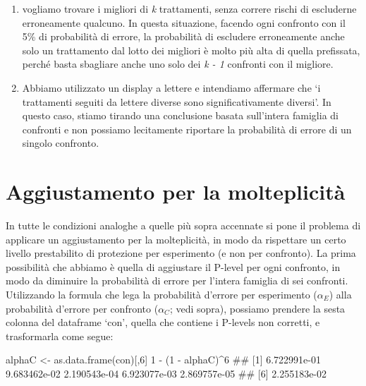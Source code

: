\documentclass[a4paper,12pt,oneside]{book}
\providecommand{\tightlist}{%
  \setlength{\itemsep}{0pt}\setlength{\parskip}{0pt}}
\newenvironment{Shaded}{\begin{snugshade}}{\end{snugshade}}
\newcommand{\DecValTok}[1]{#1}
\newcommand{\SpecialCharTok}[1]{#1}
\newcommand{\DocumentationTok}[1]{#1}
\newcommand{\OtherTok}[1]{#1}
\newcommand{\FunctionTok}[1]{#1}
\newcommand{\NormalTok}[1]{#1}
\begin{document}
\begin{enumerate}
\def\labelenumi{\arabic{enumi}.}
\tightlist
\item
  vogliamo trovare i migliori di \emph{k} trattamenti, senza correre rischi di escluderne erroneamente qualcuno. In questa situazione, facendo ogni confronto con il 5\% di probabilità di errore, la probabilità di escludere erroneamente anche solo un trattamento dal lotto dei migliori è molto più alta di quella prefissata, perché basta sbagliare anche uno solo dei \emph{k - 1} confronti con il migliore.
\item
  Abbiamo utilizzato un display a lettere e intendiamo affermare che `i trattamenti seguiti da lettere diverse sono significativamente diversi'. In questo caso, stiamo tirando una conclusione basata sull'intera famiglia di confronti e non possiamo lecitamente riportare la probabilità di errore di un singolo confronto.
\end{enumerate}

\hypertarget{aggiustamento-per-la-molteplicituxe0}{%
\section{Aggiustamento per la molteplicità}\label{aggiustamento-per-la-molteplicituxe0}}

In tutte le condizioni analoghe a quelle più sopra accennate si pone il problema di applicare un aggiustamento per la molteplicità, in modo da rispettare un certo livello prestabilito di protezione per esperimento (e non per confronto). La prima possibilità che abbiamo è quella di aggiustare il P-level per ogni confronto, in modo da diminuire la probabilità di errore per l'intera famiglia di sei confronti. Utilizzando la formula che lega la probabilità d'errore per esperimento (\(\alpha_E\)) alla probabilità d'errore per confronto (\(\alpha_C\); vedi sopra), possiamo prendere la sesta colonna del dataframe `con', quella che contiene i P-levels non corretti, e trasformarla come segue:

\scriptsize

\begin{Shaded}
\begin{Highlighting}[]
\NormalTok{alphaC }\OtherTok{\textless{}{-}} \FunctionTok{as.data.frame}\NormalTok{(con)[,}\DecValTok{6}\NormalTok{]}
\DecValTok{1} \SpecialCharTok{{-}}\NormalTok{ (}\DecValTok{1} \SpecialCharTok{{-}}\NormalTok{ alphaC)}\SpecialCharTok{\^{}}\DecValTok{6}
\DocumentationTok{\#\# [1] 6.722991e{-}01 9.683462e{-}02 2.190543e{-}04 6.923077e{-}03 2.869757e{-}05}
\DocumentationTok{\#\# [6] 2.255183e{-}02}
\end{Highlighting}
\end{Shaded}
\end{document}
